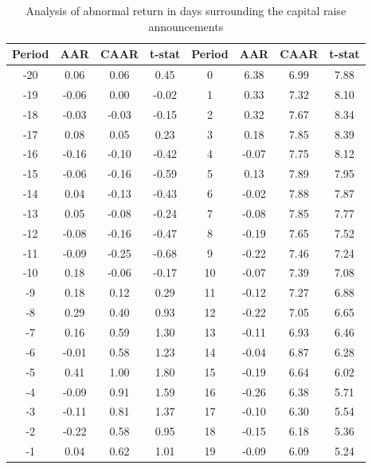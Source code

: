 \documentclass{beamer}
\begin{document}
\begin{frame}


 \centering
\begin{table}[htbp]
  \centering
  
\captionsetup{labelformat=empty}
  \caption{\tiny Analysis of abnormal return in days surrounding the capital raise announcements}
  \centering
  \resizebox{0.8\textheight}{!}
  {\tiny
    \begin{tabular}{cccc|cccc}
    \hline\hline
    Period & \multicolumn{1}{c}{AAR} & \multicolumn{1}{c}{CAAR} & \multicolumn{1}{c}{t-stat} & Period & \multicolumn{1}{c}{AAR} & \multicolumn{1}{c}{CAAR} & \multicolumn{1}{c}{t-stat} \\
    \hline    -20   & 0.06  & 0.06  & 0.45  & 0     & 6.38  & 6.99  & 7.88 \\
        -19   & -0.06 & 0.00  & -0.02 & 1     & 0.33  & 7.32  & 8.10 \\
        -18   & -0.03 & -0.03 & -0.15 & 2     & 0.32  & 7.67  & 8.34 \\
        -17   & 0.08  & 0.05  & 0.23  & 3     & 0.18  & 7.85  & 8.39 \\
        -16   & -0.16 & -0.10 & -0.42 & 4     & -0.07 & 7.75  & 8.12 \\
        -15   & -0.06 & -0.16 & -0.59 & 5     & 0.13  & 7.89  & 7.95 \\
        -14   & 0.04  & -0.13 & -0.43 & 6     & -0.02 & 7.88  & 7.87 \\
        -13   & 0.05  & -0.08 & -0.24 & 7     & -0.08 & 7.85  & 7.77 \\
        -12   & -0.08 & -0.16 & -0.47 & 8     & -0.19 & 7.65  & 7.52 \\
        -11   & -0.09 & -0.25 & -0.68 & 9     & -0.22 & 7.46  & 7.24 \\
        -10   & 0.18  & -0.06 & -0.17 & 10    & -0.07 & 7.39  & 7.08 \\
        -9    & 0.18  & 0.12  & 0.29  & 11    & -0.12 & 7.27  & 6.88 \\
        -8    & 0.29  & 0.40  & 0.93  & 12    & -0.22 & 7.05  & 6.65 \\
        -7    & 0.16  & 0.59  & 1.30  & 13    & -0.11 & 6.93  & 6.46 \\
        -6    & -0.01 & 0.58  & 1.23  & 14    & -0.04 & 6.87  & 6.28 \\
        -5    & 0.41  & 1.00  & 1.80  & 15    & -0.19 & 6.64  & 6.02 \\
        -4    & -0.09 & 0.91  & 1.59  & 16    & -0.26 & 6.38  & 5.71 \\
        -3    & -0.11 & 0.81  & 1.37  & 17    & -0.10 & 6.30  & 5.54 \\
        -2    & -0.22 & 0.58  & 0.95  & 18    & -0.15 & 6.18  & 5.36 \\
        -1    & 0.04  & 0.62  & 1.01  & 19    & -0.09 & 6.09  & 5.24 \\
    \hline\hline
    \end{tabular}%
}
\end{table}%

\end{frame}
\end{document}

